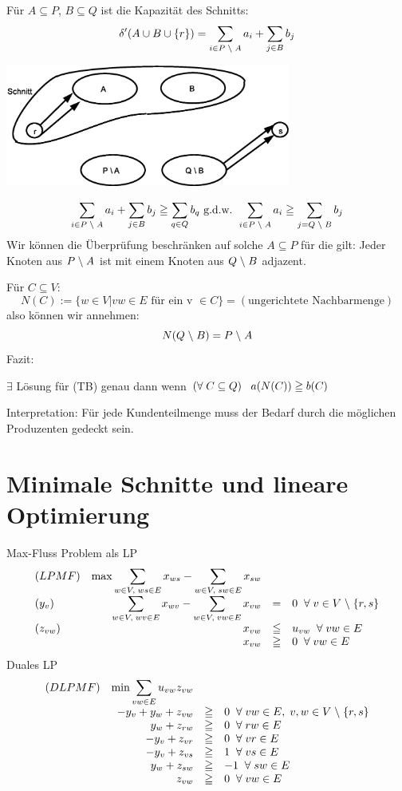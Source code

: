 Für $A \subseteq P$, $B \subseteq Q$ ist die Kapazität des Schnitts:
\[ \delta'(A\cup B \cup \{r\}) = \sum_{i \in P\;\backslash\; A} a_{i} +
\sum_{j\in B} b_{j}\]

\includegraphics[height=4cm]{bilder/3-0TransportSchnitt}

\[\sum_{i \in P\;\backslash\; A} a_{i} + \sum_{j \in B} b_{j} \geqq \sum_{q \in Q}
b_q \mbox{ g.d.w. }  \sum_{i \in P \;\backslash\; A} a_{i} \geqq \sum_{j = Q \;\backslash\;
B} b_{j}\]
Wir können die Überprüfung beschränken auf solche $A \subseteq P$ für die
gilt: Jeder Knoten aus $P \;\backslash\; A$ ist mit einem Knoten aus $Q \;\backslash\; B$
adjazent.

Für $C \subseteq V$:
\[N(C) := \{w \in V | v w \in E \mbox{ für ein v } \in C\} =
(\mbox{ungerichtete Nachbarmenge}) \]
also können wir annehmen:
\[N(Q \;\backslash\; B) = P \;\backslash\; A\]
Fazit:
\begin{satz}
$\exists$ Lösung für (TB) genau dann wenn $(\forall \; C \subseteq Q)
\hspace{3mm} a(N(C)) \geqq b(C)$
\end{satz}

Interpretation: Für jede Kundenteilmenge muss der Bedarf durch die
möglichen Produzenten gedeckt sein.

\section{Minimale Schnitte und lineare Optimierung}

Max-Fluss Problem als LP
\[\begin{array}{lrcl}
(LPMF)& \max \displaystyle \sum_{w \in V,\; w s \in E} x_{w s} -
\sum_{w \in V, \; s w \in E} x_{s w}\\
(y_{v})& \displaystyle \sum_{w \in V, \; w v \in E} x_{w v} - \sum_{w \in V,
\; v w \in E} x_{v w}&=& 0 \; \; \forall \; v \in V \;\backslash\; \{r,s\}\\
(z_{v w})& x_{v w } &\leqq& u_{v w} \; \; \forall \; v w  \in E\\
&x_{v w} &\geqq & 0 \; \; \forall \; v w \in E
\end{array}
\]
Duales LP
\[\begin{array}{lrcl}
(DLPMF)& \min \displaystyle \sum_{v w \in E} u_{v w} z_{v w}\\
&-y_{v} + y_{w} + z_{v w } &\geqq &0 \; \; \forall \; v w \in E, \; v,w \in
V \;\backslash\; \{r,s\}\\
&y_{w} + z_{r w} &\geqq& 0 \; \; \forall \; r w \in E\\
&-y_{v} + z_{v r} &\geqq& 0 \; \; \forall \; v r \in E\\
&-y_{v} + z_{v s} &\geqq& 1 \; \; \forall \; vs \in E\\
&y_{w} + z_{s w} &\geqq& -1 \; \; \forall \; s w \in E\\
&z_{v w } &\geqq& 0 \; \; \forall \; v w  \in E
\end{array}\]

